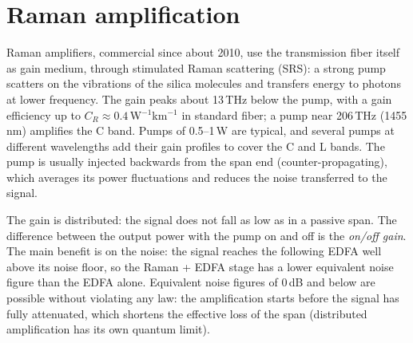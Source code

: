 \section{Raman amplification}\label{sec:raman}
Raman amplifiers, commercial since about 2010, use the transmission fiber itself as gain medium,
through stimulated Raman scattering (SRS): a strong pump scatters on the vibrations of the silica
molecules and transfers energy to photons at lower frequency. The gain peaks about 13\,THz below the
pump, with a gain efficiency up to $C_R\approx0.4$\,W$^{-1}$km$^{-1}$ in standard fiber; a pump near 206\,THz
(1455\,nm) amplifies the C band. Pumps of 0.5--1\,W are typical, and several pumps at different
wavelengths add their gain profiles to cover the C and L bands. The pump is usually injected
backwards from the span end (counter-propagating), which averages its power fluctuations and
reduces the noise transferred to the signal.

The gain is distributed: the signal does not fall as low as in a passive span. The difference
between the output power with the pump on and off is the \emph{on/off gain}. The main benefit is on
the noise: the signal reaches the following EDFA well above its noise floor, so the Raman + EDFA
stage has a lower equivalent noise figure than the EDFA alone. Equivalent noise figures of 0\,dB and
below are possible without violating any law: the amplification starts before the signal has
fully attenuated, which shortens the effective loss of the span (distributed amplification has
its own quantum limit).

